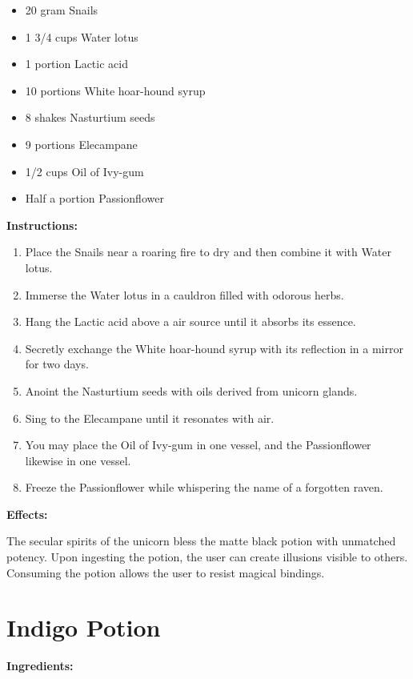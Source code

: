 \documentclass{article}
\begin{document}
\begin{itemize}
  \item 20 gram Snails
  \item 1 3/4 cups Water lotus
  \item 1 portion Lactic acid
  \item 10 portions White hoar-hound syrup
  \item 8 shakes Nasturtium seeds
  \item 9 portions Elecampane
  \item 1/2 cups Oil of Ivy-gum
  \item Half a portion Passionflower
\end{itemize}

\textbf{Instructions:}

\begin{enumerate}
  \item Place the Snails near a roaring fire to dry and then combine it with Water lotus.
  \item Immerse the Water lotus in a cauldron filled with odorous herbs.
  \item Hang the Lactic acid above a air source until it absorbs its essence.
  \item Secretly exchange the White hoar-hound syrup with its reflection in a mirror for two days.
  \item Anoint the Nasturtium seeds with oils derived from unicorn glands.
  \item Sing to the Elecampane until it resonates with air.
  \item You may place the Oil of Ivy-gum in one vessel, and the Passionflower likewise in one vessel.
  \item Freeze the Passionflower while whispering the name of a forgotten raven.
\end{enumerate}

\textbf{Effects:}

The secular spirits of the unicorn bless the matte black potion with unmatched potency. Upon ingesting the potion, the user can create illusions visible to others. Consuming the potion allows the user to resist magical bindings.

\newpage
\section*{Indigo Potion}

\textbf{Ingredients:}
\end{document}
